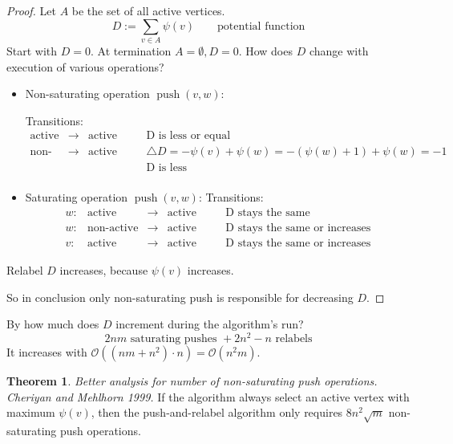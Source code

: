 \documentclass[a4paper]{article}
\theoremstyle{definition}
\newtheorem{theorem}{Theorem}
\DeclareMathOperator{\push}{push}
\begin{document}
\begin{proof}
  Let $A$ be the set of all active vertices.
  \[
    D := \sum_{v \in A} \psi(v) \qquad \text{potential function}
  \]
  Start with $D = 0$. At termination $A = \emptyset, D = 0$.
  How does $D$ change with execution of various operations?

  \begin{itemize}
    \item Non-saturating operation $\push(v, w)$:

      Transitions:
      \[
        \begin{array}{rclcc}
          \text{active}     & \rightarrow & \text{active} & \quad & \text{D is less or equal} \\
          \text{non-active} & \rightarrow & \text{active} & \quad & \triangle D = -\psi(v) + \psi(w) = -(\psi(w) + 1) + \psi(w) = -1 \\
                            &             &               &       & \text{D is less} \\
        \end{array}
      \]

    \item Saturating operation $\push(v, w)$:
      Transitions:
      \[
        \begin{array}{rrclcc}
          w: & \text{active}     & \rightarrow & \text{active} & \quad & \text{D stays the same} \\
          w: & \text{non-active} & \rightarrow & \text{active} & \quad & \text{D stays the same or increases} \\
          v: & \text{active}     & \rightarrow & \text{active} & \quad & \text{D stays the same or increases}
        \end{array}
      \]
  \end{itemize}

  Relabel $D$ increases, because $\psi(v)$ increases.

  So in conclusion only non-saturating push is responsible for decreasing $D$.

\end{proof}

By how much does $D$ increment during the algorithm's run?
\[
  2nm \text{ saturating pushes } + 2n^2 - n \text{ relabels}
\]
It increases with $\mathcal{O}((nm + n^2) \cdot n) = \mathcal{O}(n^2m)$.

\begin{theorem}\label{lemma-4.14}
  \emph{Better analysis for number of non-saturating push operations. Cheriyan and Mehlhorn 1999.}
  If the algorithm always select an active vertex with maximum $\psi(v)$, then the push-and-relabel algorithm only requires $8n^2 \sqrt{m}$ non-saturating push operations.
\end{theorem}
\end{document}
